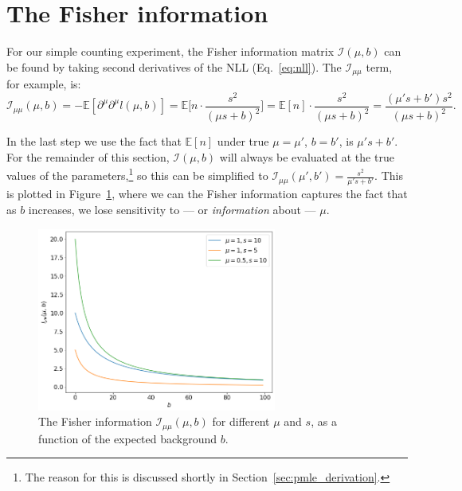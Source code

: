\section{The Fisher information}

For our simple counting experiment, the Fisher information matrix $\mathcal I(\mu, b)$ can be found by taking second derivatives of the NLL (Eq.~\ref{eq:nll}).
The $\mathcal I_{\mu\mu}$ term, for example, is:
\begin{equation}
    \mathcal I_{\mu\mu}(\mu, b) = - \mathbb E[\partial^\mu\partial^\mu l(\mu, b)] = \mathbb E \bigg[n \cdot \frac{s^2}{(\mu s + b)^2}\bigg] = \mathbb E[n] \cdot \frac{s^2}{(\mu s + b)^2} = \frac{(\mu' s + b') s^2}{(\mu s + b)^2}.
\label{eq:fisher}
\end{equation}

In the last step we use the fact that $\mathbb E[n]$ under true $\mu = \mu'$, $b = b'$, is $\mu' s + b'$.
For the remainder of this section, $\mathcal I(\mu, b)$ will always be evaluated at the true values of the parameters,\footnote{The reason for this is discussed shortly in Section~\ref{sec:pmle_derivation}.} so this can be simplified to $\mathcal I_{\mu\mu}(\mu', b') = \frac{s^2}{\mu' s + b'}$.
This is plotted in Figure~\ref{fig:fisher}, where we can the Fisher information captures the fact that as $b$ increases, we lose sensitivity to --- or \textit{information} about --- $\mu$.

\begin{figure}[htb]
\centering
\includegraphics[width=0.7\textwidth]{figures/05-asymptotic-mle/3.png}
\caption{The Fisher information $\mathcal I_{\mu\mu}(\mu, b)$ for different $\mu$ and $s$, as a function of the expected background $b$.}
\label{fig:fisher}
\end{figure}

